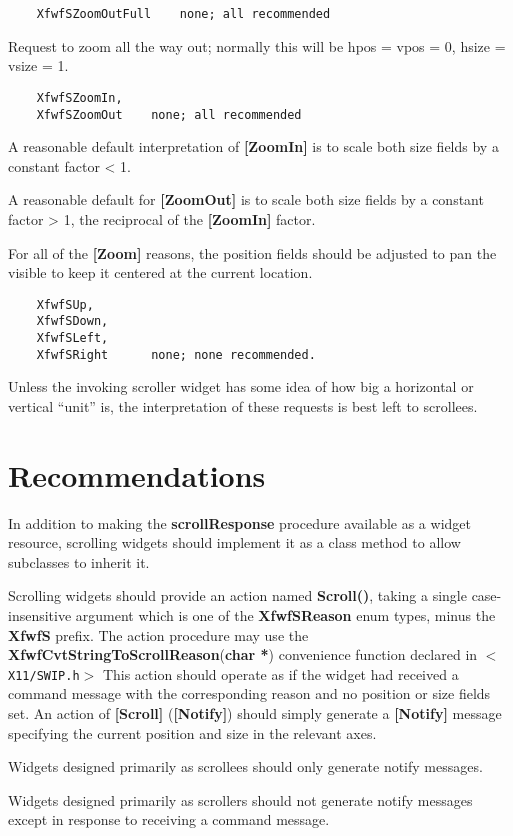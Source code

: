 \begin{verbatim}
    XfwfSZoomOutFull	none; all recommended
\end{verbatim}

    	Request to zoom all the way out; normally this will be
	hpos = vpos = 0, hsize = vsize = 1.

\begin{verbatim}
    XfwfSZoomIn,
    XfwfSZoomOut	none; all recommended
\end{verbatim}

    	A reasonable default interpretation of {\bf [ZoomIn]} is to scale
	both size fields by a constant factor < 1.

	A reasonable default for {\bf [ZoomOut]} is to scale both size fields
	by a constant factor > 1, the reciprocal of the {\bf [ZoomIn]} factor.

    For all of the {\bf [Zoom]} reasons, the position fields should be
    adjusted to pan the visible to keep it centered at the current
    location.

\begin{verbatim}
    XfwfSUp,
    XfwfSDown,
    XfwfSLeft,
    XfwfSRight		none; none recommended.
\end{verbatim}

    	Unless the invoking scroller widget has some idea of how big a
	horizontal or vertical ``unit'' is, the interpretation of
	these requests is best left to scrollees.


\section{Recommendations}

In addition to making the {\bf scrollResponse} procedure available as a
widget resource, scrolling widgets should implement it as a class
method to allow subclasses to inherit it.

Scrolling widgets should provide an action named {\bf Scroll()}, taking a
single case-insensitive argument which is one of the {\bf XfwfSReason} enum
types, minus the {\bf XfwfS} prefix.  The action procedure may use the
{\bf XfwfCvtStringToScrollReason}({\bf char *}) convenience function declared
in {\tt $<$X11/SWIP.h$>$} This action should operate as if the widget had
received a command message with the corresponding reason and no
position or size fields set.  An action of {\bf [Scroll]} ({\bf [Notify]})
should simply generate a {\bf [Notify]} message specifying the current
position and size in the relevant axes.

Widgets designed primarily as scrollees should only generate notify
messages.

Widgets designed primarily as scrollers should not generate notify
messages except in response to receiving a command message.



